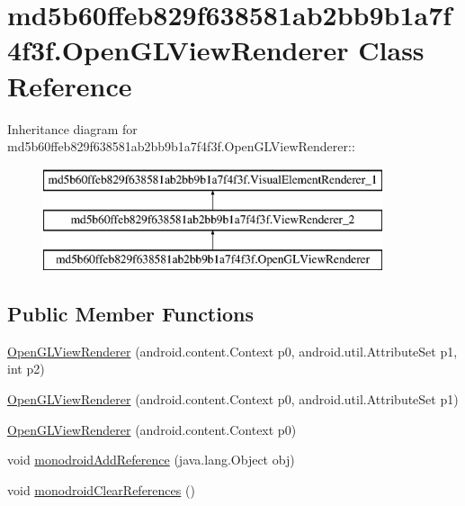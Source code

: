\hypertarget{classmd5b60ffeb829f638581ab2bb9b1a7f4f3f_1_1_open_g_l_view_renderer}{
\section{md5b60ffeb829f638581ab2bb9b1a7f4f3f.OpenGLViewRenderer Class Reference}
\label{classmd5b60ffeb829f638581ab2bb9b1a7f4f3f_1_1_open_g_l_view_renderer}
}
Inheritance diagram for md5b60ffeb829f638581ab2bb9b1a7f4f3f.OpenGLViewRenderer::\begin{figure}[H]
\begin{center}
\leavevmode
\includegraphics[height=3cm]{classmd5b60ffeb829f638581ab2bb9b1a7f4f3f_1_1_open_g_l_view_renderer}
\end{center}
\end{figure}
\subsection*{Public Member Functions}
\begin{CompactItemize}
\item 
\hyperlink{classmd5b60ffeb829f638581ab2bb9b1a7f4f3f_1_1_open_g_l_view_renderer_28f906bba65e6ae686fcd64c6f4d3c76}{OpenGLViewRenderer} (android.content.Context p0, android.util.AttributeSet p1, int p2)
\item 
\hyperlink{classmd5b60ffeb829f638581ab2bb9b1a7f4f3f_1_1_open_g_l_view_renderer_acf21ab10c0a6caa88ed7d495cca1f55}{OpenGLViewRenderer} (android.content.Context p0, android.util.AttributeSet p1)
\item 
\hyperlink{classmd5b60ffeb829f638581ab2bb9b1a7f4f3f_1_1_open_g_l_view_renderer_af6cac6430c4b077a72790d407622dcb}{OpenGLViewRenderer} (android.content.Context p0)
\item 
void \hyperlink{classmd5b60ffeb829f638581ab2bb9b1a7f4f3f_1_1_open_g_l_view_renderer_c8094bbc57aebaa1cd453bac15ea5c5c}{monodroidAddReference} (java.lang.Object obj)
\item 
void \hyperlink{classmd5b60ffeb829f638581ab2bb9b1a7f4f3f_1_1_open_g_l_view_renderer_ba5ec714afa8ec3c8390a6881dd96e13}{monodroidClearReferences} ()
\end{CompactItemize}
